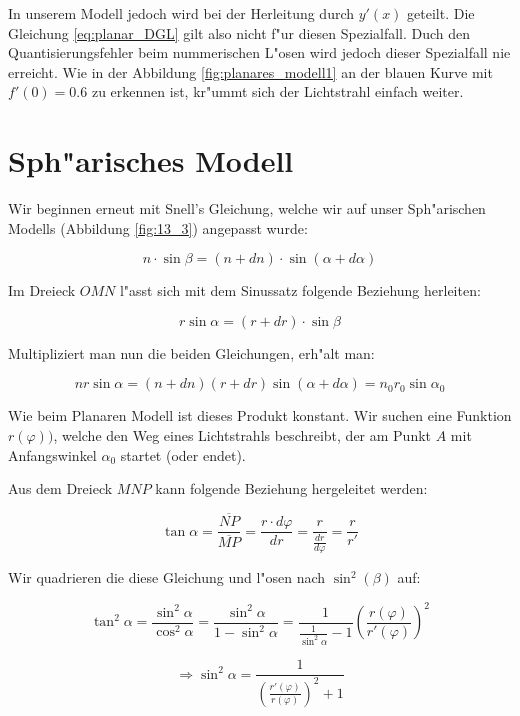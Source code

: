 In unserem Modell jedoch wird bei der Herleitung durch $y'(x)$ geteilt.
Die Gleichung \ref{eq:planar_DGL} gilt also nicht f"ur diesen Spezialfall. 
Duch den Quantisierungsfehler beim nummerischen L"osen wird jedoch dieser Spezialfall nie erreicht.
Wie in der Abbildung \ref{fig:planares_modell1} an der blauen Kurve mit $f'(0) = 0.6$ zu erkennen ist, kr"ummt sich der Lichtstrahl einfach weiter. 


\section{Sph"arisches Modell}

Wir beginnen erneut mit Snell's Gleichung, welche wir auf unser Sph"arischen Modells (Abbildung \ref{fig:13_3}) angepasst wurde: 

$$n \cdot \sin \beta = (n + dn) \cdot \sin(\alpha + d\alpha)$$

Im Dreieck $OMN$ l"asst sich mit dem Sinussatz folgende Beziehung herleiten:

$$r \sin\alpha = (r + dr) \cdot \sin\beta$$

Multipliziert man nun die beiden Gleichungen, erh"alt man:

\begin{equation} \label{eq:sphere_base}
n r \sin \alpha = (n + dn)(r + dr) \sin (\alpha + d\alpha) = n_0 r_0 \sin \alpha_0
\end{equation}

Wie beim Planaren Modell ist dieses Produkt konstant. 
Wir suchen eine Funktion $r(\varphi))$, welche den Weg eines Lichtstrahls beschreibt, der am Punkt $A$ mit Anfangswinkel $\alpha_0$ startet (oder endet). 

Aus dem Dreieck $MNP$ kann folgende Beziehung hergeleitet werden:

$$\tan \alpha =  \frac{\overline{NP}}{\overline{MP}} = \frac{r \cdot d\varphi}{dr} = \frac{r}{\frac{dr}{d\varphi}} = \frac{r}{r'}$$

Wir quadrieren die diese Gleichung und l"osen nach $\sin^2(\beta)$ auf:

$$\tan^2 \alpha = \frac{\sin^2\alpha}{\cos^2\alpha} = \frac{\sin^2\alpha}{1-\sin^2\alpha} = \frac{1}{\frac{1}{\sin^2\alpha}-1} \left( \frac{r(\varphi)}{r'(\varphi)} \right)^2$$

\begin{equation} \label{eq:sphere_sine}
\Rightarrow \sin^2\alpha = \frac{1}{\left( \frac{r'(\varphi)}{r(\varphi)} \right)^2 +1}
\end{equation}

